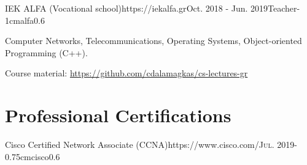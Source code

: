 \documentclass{mycv}
\begin{document}

	\begin{EntryDatedLogo}{IEK ALFA (Vocational school)}{https://iekalfa.gr}{Oct. 2018 - Jun. 2019}{Teacher}{-1cm}{alfa}{0.6}
		\begin{Itemize}
			\item Computer Networks, Telecommunications, Operating Systems, Object-oriented Programming (C++).
			\item Course material: \url{https://github.com/cdalamagkas/cs-lectures-gr}
		\end{Itemize}
	\end{EntryDatedLogo}
		



	\vspace*{0.5cm}
		
	\section{Professional Certifications}
	\begin{EntryDatedLogo}{Cisco Certified Network Associate (CCNA)}{https://www.cisco.com/}{\scshape{Jul. 2019}}{}{-0.75cm}{cisco}{0.6}
	\end{EntryDatedLogo}
	
\end{document}
